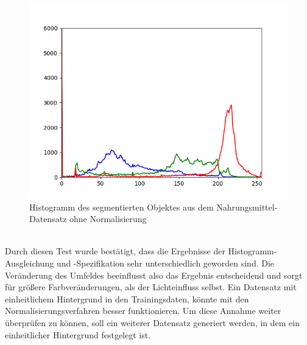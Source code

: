 \begin{figure}[htb]
\begin{minipage}[c]{0.08\textwidth}
\end{minipage}
\hfill
\begin{minipage}[c]{0.3\textwidth}
\includegraphics[width=\textwidth]{Sources/Bild2_histo.png}
\end{minipage}
\caption{Histogramm des segmentierten Objektes aus dem Nahrungsmittel-Datensatz ohne Normalisierung}
\label{img:evalnorm}
\end{figure}\\
Durch diesen Test wurde bestätigt, dass die Ergebnisse der Histogramm-Ausgleichung und -Spezifikation sehr unterschiedlich geworden sind. Die Veränderung des Umfeldes beeinflusst also das Ergebnis entscheidend und sorgt für größere Farbveränderungen, als der Lichteinfluss selbst.
Ein Datensatz mit einheitlichem Hintergrund in den Trainingsdaten, könnte mit den Normalisierungsverfahren besser funktionieren. Um diese Annahme weiter überprüfen zu können, soll ein weiterer Datensatz generiert werden, in dem ein einheitlicher Hintergrund festgelegt ist. 

